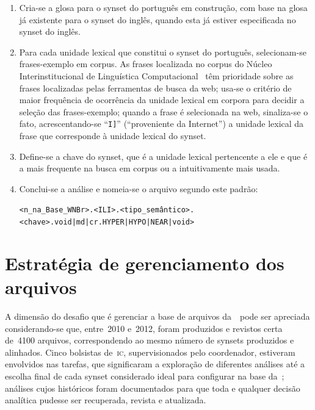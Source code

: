 \begin{enumerate}
  \item Cria-se a glosa para o synset do português em construção, com base na
    glosa já existente para o synset do inglês, quando esta já estiver
    especificada no synset do inglês.

  \item Para cada unidade lexical que constitui o synset do português,
    selecionam-se frases-exemplo em corpus. As frases localizada no corpus do
    Núcleo Interinstitucional de Linguística Computacional~\cite{nilc} têm
    prioridade sobre as frases localizadas pelas ferramentas de busca da web;
    usa-se o critério de maior frequência de ocorrência da unidade lexical em
    corpora para decidir a seleção das frases-exemplo; quando a frase é selecionada
  na web, sinaliza-se o fato, acrescentando-se ``\texttt{I]}'' (``proveniente da
  Internet'') a unidade lexical da frase que corresponde à unidade lexical do
  synset.

\item Define-se a chave do synset, que é a unidade lexical pertencente a ele e
  que é a mais frequente na busca em corpus ou a intuitivamente mais usada.

\item Conclui-se a análise e nomeia-se o arquivo segundo este padrão:

  \begin{center}
    \texttt{<n\textordmasculine\_na\_Base\_WNBr>.<ILI>.<tipo\_semântico>.
    <chave>.void|md|cr.HYPER|HYPO|NEAR|void>}
  \end{center}

\end{enumerate}

\section{Estratégia de gerenciamento dos arquivos}

A dimensão do desafio que é gerenciar a base de arquivos da~\wnbr\ pode ser
apreciada considerando-se que, entre~2010 e~2012, foram produzidos e revistos
certa de~4100 arquivos, correspondendo ao mesmo número de synsets produzidos e
alinhados. Cinco bolsistas de~\textsc{ic}, supervisionados pelo coordenador,
estiveram envolvidos nas tarefas, que significaram a exploração de diferentes
análises até a escolha final de cada synset considerado ideal para configurar
na base da~\wnbr; análises cujos históricos foram documentados para que toda e
qualquer decisão analítica pudesse ser recuperada, revista e atualizada.

